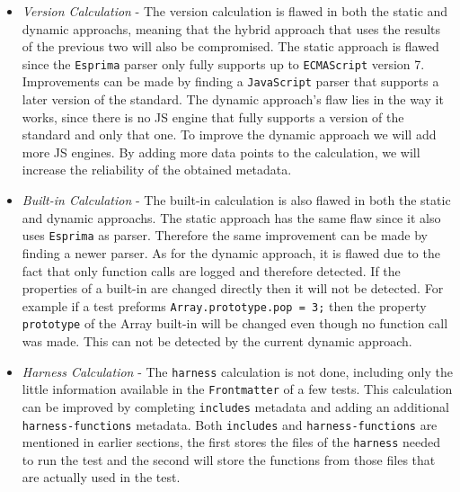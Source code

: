 \documentclass[runningheads]{llncs}
\begin{document}
\begin{itemize}
\item \emph{Version Calculation} - The version calculation is flawed in both the static and dynamic approachs, meaning that the hybrid approach that uses the results of the previous two will also be compromised. The static approach is flawed since the \texttt{Esprima} parser only fully supports up to \texttt{ECMAScript} version 7. Improvements can be made by finding a \texttt{JavaScript} parser that supports a later version of the standard. The dynamic approach's flaw lies in the way it works, since there is no JS engine that fully supports a version of the standard and only that one. To improve the dynamic approach we will add more JS engines. By adding more data points to the calculation, we will increase the reliability of the obtained metadata.
%
\item \emph{Built-in Calculation} - The built-in calculation is also flawed in both the static and dynamic approachs. The static approach has the same flaw since it also uses \texttt{Esprima} as parser. Therefore the same improvement can be made by finding a newer parser. As for the dynamic approach, it is flawed due to the fact that only function calls are logged and therefore detected. If the properties of a built-in are changed directly then it will not be detected. For example if a test preforms \texttt{Array.prototype.pop = 3;} then the property \texttt{prototype} of the Array built-in will be changed even though no function call was made. This can not be detected by the current dynamic approach.
%
\item \emph{Harness Calculation} - The \texttt{harness} calculation is not done, including only the little information available in the \texttt{Frontmatter} of a few tests. This calculation can be improved by completing \texttt{includes} metadata and adding an additional \texttt{harness-functions} metadata. Both \texttt{includes} and \texttt{harness-functions} are mentioned in earlier sections, the first stores the files of the \texttt{harness} needed to run the test and the second will store the functions from those files that are actually used in the test.
\end{itemize}
\end{document}
